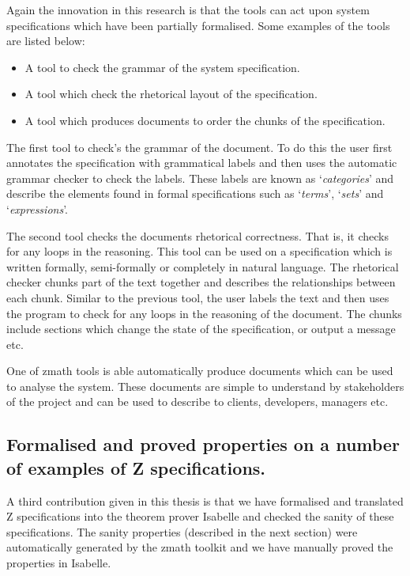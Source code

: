 Again the innovation in this research is that the tools can act upon system
specifications which have been partially formalised. Some examples of the tools
are listed below:

\begin{itemize}
\item A tool to check the grammar of the system specification.

\item A tool which check the rhetorical layout of the specification.

\item A tool which produces documents to order the chunks of the specification.
\end{itemize}

The first tool to check's the grammar of the document. To do this the user first
annotates the specification with grammatical labels and then uses the automatic
grammar checker to check the labels. These labels are known as
`\emph{categories}' and describe the elements found in formal specifications
such as `\emph{terms}', `\emph{sets}' and `\emph{expressions}'. 

The second tool checks the documents rhetorical correctness. That is, it checks
for any loops in the reasoning. This tool can be used on a specification which
is written formally, semi-formally or completely in natural language. The
rhetorical checker chunks part of the text together and describes the
relationships between each chunk. Similar to the previous tool, the user labels
the text and then uses the program to check for any loops in the reasoning of
the document. The chunks include sections which change the state of the
specification, or output a message etc.

One of \gls{zmath} tools is able automatically produce documents which can be
used to analyse the system. These documents are simple to understand by
stakeholders of the project and can be used to describe to clients, developers,
managers etc. 

\subsection{Formalised and proved properties on a number of examples of Z specifications.}

A third contribution given in this thesis is that we have formalised and
translated Z specifications into the theorem prover Isabelle and checked the
sanity of these specifications. The sanity properties (described in the next
section) were automatically generated by the \gls{zmath} toolkit and we have
manually proved the properties in Isabelle.

